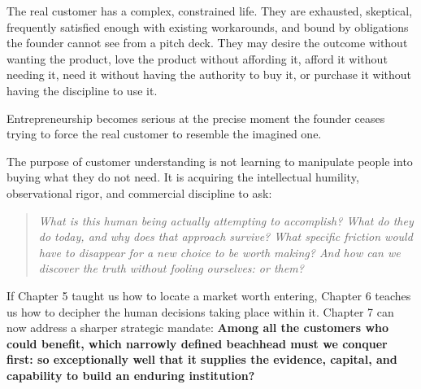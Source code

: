 The real customer has a complex, constrained life. They are exhausted, skeptical, frequently satisfied enough with existing workarounds, and bound by obligations the founder cannot see from a pitch deck. They may desire the outcome without wanting the product, love the product without affording it, afford it without needing it, need it without having the authority to buy it, or purchase it without having the discipline to use it.

Entrepreneurship becomes serious at the precise moment the founder ceases trying to force the real customer to resemble the imagined one.

The purpose of customer understanding is not learning to manipulate people into buying what they do not need. It is acquiring the intellectual humility, observational rigor, and commercial discipline to ask:
\begin{quote}
\small\itshape
What is this human being actually attempting to accomplish? What do they do today, and why does that approach survive? What specific friction would have to disappear for a new choice to be worth making? And how can we discover the truth without fooling ourselves: or them?
\end{quote}

If Chapter 5 taught us how to locate a market worth entering, Chapter 6 teaches us how to decipher the human decisions taking place within it. Chapter 7 can now address a sharper strategic mandate: \textbf{Among all the customers who could benefit, which narrowly defined beachhead must we conquer first: so exceptionally well that it supplies the evidence, capital, and capability to build an enduring institution?}
